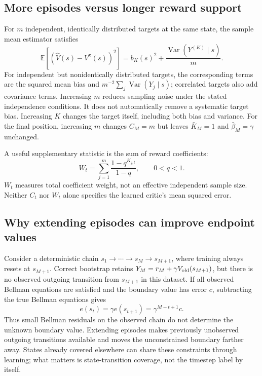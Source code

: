 \documentclass[11pt,a4paper]{article}
\numberwithin{equation}{section}
\newcommand{\E}{\mathbb E}
\newcommand{\Var}{\operatorname{Var}}
\begin{document}
\subsection{More episodes versus longer reward support}
For $m$ independent, identically distributed targets at the same state, the sample
mean estimator satisfies
\begin{equation}
 \E[(\hat V(s)-V^\pi(s))^2]=b_K(s)^2+
 \frac{\Var(Y^{(K)}\mid s)}{m}.
\end{equation}
For independent but nonidentically distributed targets, the corresponding terms
are the squared mean bias and $m^{-2}\sum_j\Var(Y_j\mid s)$; correlated targets
also add covariance terms. Increasing $m$ reduces sampling noise under the stated
independence conditions. It does not automatically remove a systematic target
bias. Increasing $K$ changes the target itself, including both bias and variance.
For the final position, increasing $m$ changes $C_M=m$ but leaves
$\bar K_M=1$ and $\bar\beta_M=\gamma$ unchanged.

A useful supplementary statistic is the sum of reward coefficients:
\begin{equation}
 W_t=\sum_{j=1}^{m}\frac{1-q^{K_{j,t}}}{1-q},\qquad 0<q<1.
\end{equation}
$W_t$ measures total coefficient weight, not an effective independent sample size.
Neither $C_t$ nor $W_t$ alone specifies the learned critic's mean squared error.

\subsection{Why extending episodes can improve endpoint values}
Consider a deterministic chain $s_1\to\cdots\to s_M\to s_{M+1}$, where training
always resets at $s_{M+1}$. Correct bootstrap retains
$Y_M=r_M+\gamma V_{\rm old}(s_{M+1})$, but there is no observed outgoing transition
from $s_{M+1}$ in this dataset. If all observed Bellman equations are satisfied
and the boundary value has error $c$, subtracting the true Bellman equations gives
\begin{equation}
 e(s_t)=\gamma e(s_{t+1})
       =\boxed{\gamma^{M-t+1}c}.
\end{equation}
Thus small Bellman residuals on the observed chain do not determine the unknown
boundary value. Extending episodes makes previously unobserved outgoing
transitions available and moves the unconstrained boundary farther away.
States already covered elsewhere can share these constraints through learning;
what matters is state-transition coverage, not the timestep label by itself.
\end{document}
